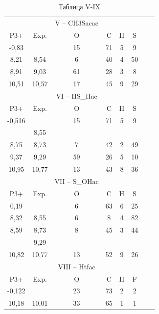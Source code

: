 \documentclass[a4paper,fleqn]{cas-dc}
\begin{document}
\begin{table}[t]
    \caption{Таблица V-IX}
    \begin{tabular}{@{}ccccccll@{}}
    \toprule
           &       & V – CH3Sacac  &    &    &    &  &  \\
    P3+    & Exp.  & O             & C  & H  & S  &  &  \\\midrule
    -0,83  &       & 15            & 71 & 5  & 9  &  &  \\
    8,21   & 8,54  & 6             & 40 & 4  & 50 &  &  \\
    8,91   & 9,03  & 61            & 28 & 3  & 8  &  &  \\
    10,51  & 10,57 & 17            & 45 & 9  & 29 &  &  \\\midrule
           &       & VI – HS\_Hac  &    &    &    &  &  \\
    P3+    & Exp.  & O             & C  & H  & S  &  &  \\\midrule
    -0,516 &       & 15            & 71 & 5  & 9  &  &  \\
           & 8,55  &               &    &    &    &  &  \\
    8,75   & 8,73  & 7             & 42 & 2  & 49 &  &  \\
    9,37   & 9,29  & 59            & 26 & 5  & 10 &  &  \\
    10,95  & 10,77 & 13            & 43 & 8  & 36 &  &  \\\midrule
           &       & VII – S\_OHac &    &    &    &  &  \\
    P3+    & Exp.  & O             & C  & H  & S  &  &  \\\midrule
    0,19   &       & 6             & 63 & 6  & 25 &  &  \\
    8,32   & 8,55  & 6             & 8  & 4  & 82 &  &  \\
    8,59   & 8,73  & 8             & 45 & 3  & 44 &  &  \\
           & 9,29  &               &    &    &    &  &  \\
    10,82  & 10,77 & 13            & 52 & 9  & 26 &  &  \\\midrule
           &       & VIII – Htfac  &    &    &    &  &  \\
    P3+    & Exp.  & O             & C  & H  & F  &  &  \\\midrule
    -0,122 &       & 23            & 73 & 2  & 2  &  &  \\
    10,18  & 10,01 & 33            & 65 & 1  & 1  &  &  \\

\end{tabular}
\end{table}
\end{document}
